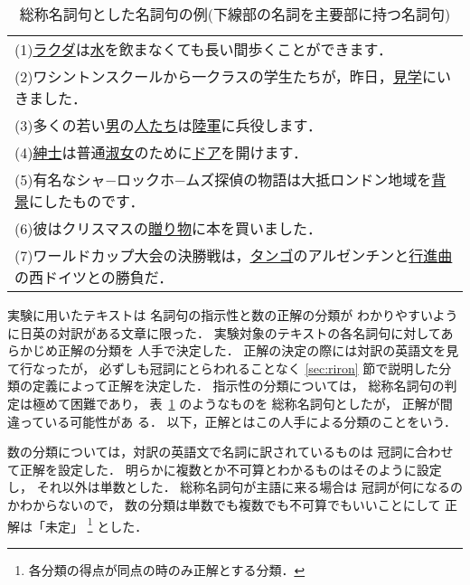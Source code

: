 \begin{table}[t]
\small

\caption{総称名詞句とした名詞句の例(下線部の名詞を主要部に持つ名詞句)}\label{fig:sousyou}

{
  \begin{center}

\begin{tabular}{|l|} \hline

(1)\underline{ラクダ}は\underline{水}を飲まなくても長い間歩くことができます．\\ 

(2)ワシントンスクールから一クラスの学生たちが，昨日，\underline{見学}にいきました．\\ 

(3)多くの若い\underline{男}の\underline{人たち}は\underline{陸軍}に兵役します．\\ 

(4)\underline{紳士}は普通\underline{淑女}のために\underline{ドア}を開けます．\\ 

(5)有名なシャ−ロックホ−ムズ探偵の物語は大抵ロンドン地域を\underline{背景}にしたものです．\\ 

(6)彼はクリスマスの\underline{贈り物}に本を買いました．\\ 

(7)ワールドカップ大会の決勝戦は，\underline{タンゴ}のアルゼンチンと\underline{行進曲}の西ドイツとの勝負だ．\\[0.1cm] \hline
\end{tabular}
    
  \end{center}
}

\end{table}


実験に用いたテキストは
名詞句の指示性と数の正解の分類が
わかりやすいように日英の対訳がある文章に限った．
実験対象のテキストの各名詞句に対してあらかじめ正解の分類を
人手で決定した．
正解の決定の際には対訳の英語文を見て行なったが，
必ずしも冠詞にとらわれることなく
\ref{sec:riron} 節で説明した分類の定義によって正解を決定した．
指示性の分類については，
総称名詞句の判定は極めて困難であり，
表~\ref{fig:sousyou} のようなものを
総称名詞句としたが，
正解が間違っている可能性があ
る．
以下，正解とはこの人手による分類のことをいう．


数の分類については，対訳の英語文で名詞に訳されているものは
冠詞に合わせて正解を設定した．
明らかに複数とか不可算とわかるものはそのように設定し，
それ以外は単数とした．
総称名詞句が主語に来る場合は
冠詞が何になるのかわからないので，
数の分類は単数でも複数でも不可算でもいいことにして
正解は「未定」
\footnote{
各分類の得点が同点の時のみ正解とする分類．
}
とした．


